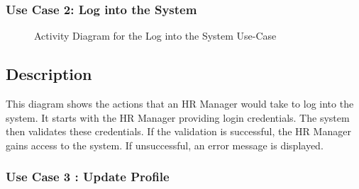 \subsubsection{Use Case 2: Log into the System} 

\begin{figure}[H]
    \centering
    \caption{ Activity Diagram for the Log into the System Use-Case }
    \label{fig:UseCase2_Activity_Diagram}
\end{figure}

\subsection*{Description}
This diagram shows the actions that an HR Manager would take to log into the system. It starts with the HR Manager providing login credentials. The system then validates these credentials. If the validation is successful, the HR Manager gains access to the system. If unsuccessful, an error message is displayed.


\subsubsection{Use Case 3 : Update Profile} 


